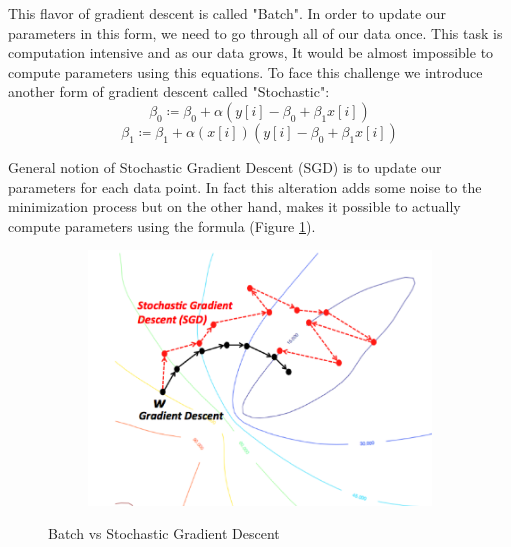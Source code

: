 \documentclass[12pt]{article}
\begin{document}
This flavor of gradient descent is called "Batch". In order to update our parameters in this form, we need to go through all of our data once. This task is computation intensive and as our data grows, It would be almost impossible to compute parameters using this equations. To face this challenge we introduce another form of gradient descent called "Stochastic":
$$\beta_0 \coloneqq \beta_0 + \alpha (y[i]-\beta_0 + \beta_1 x[i])$$
$$\beta_1 \coloneqq \beta_1 + \alpha (x[i]) (y[i]-\beta_0 + \beta_1 x[i])$$

General notion of Stochastic Gradient Descent (SGD) is to update our parameters for each data point. In fact this alteration adds some noise to the minimization process but on the other hand, makes it possible to actually compute parameters using the formula (Figure \ref{fig:sgd}). 
\begin{figure}[h!]
  \centering  
  \begin{subfigure}[b]{0.5\linewidth}
    \includegraphics[width=\linewidth]{./images/sgd.png}
  \end{subfigure}
  \caption{Batch vs Stochastic Gradient Descent}
  \label{fig:sgd}
\end{figure}
\end{document}
